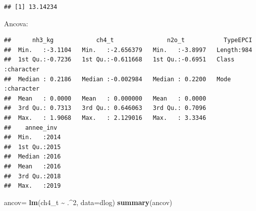 \documentclass[
]{article}
\newenvironment{Shaded}{\begin{snugshade}}{\end{snugshade}}
\newcommand{\AttributeTok}[1]{\textcolor[rgb]{0.13,0.29,0.53}{#1}}
\newcommand{\DecValTok}[1]{\textcolor[rgb]{0.00,0.00,0.81}{#1}}
\newcommand{\FunctionTok}[1]{\textcolor[rgb]{0.13,0.29,0.53}{\textbf{#1}}}
\newcommand{\NormalTok}[1]{#1}
\newcommand{\OtherTok}[1]{\textcolor[rgb]{0.56,0.35,0.01}{#1}}
\newcommand{\SpecialCharTok}[1]{\textcolor[rgb]{0.81,0.36,0.00}{\textbf{#1}}}
\begin{document}
\begin{verbatim}
## [1] 13.14234
\end{verbatim}

Ancova:

\begin{Shaded}
\end{Shaded}

\begin{verbatim}
##      nh3_kg            ch4_t               n2o_t           TypeEPCI        
##  Min.   :-3.1104   Min.   :-2.656379   Min.   :-3.8997   Length:984        
##  1st Qu.:-0.7236   1st Qu.:-0.611668   1st Qu.:-0.6951   Class :character  
##  Median : 0.2186   Median :-0.002984   Median : 0.2200   Mode  :character  
##  Mean   : 0.0000   Mean   : 0.000000   Mean   : 0.0000                     
##  3rd Qu.: 0.7313   3rd Qu.: 0.646063   3rd Qu.: 0.7096                     
##  Max.   : 1.9068   Max.   : 2.129016   Max.   : 3.3346                     
##    annee_inv   
##  Min.   :2014  
##  1st Qu.:2015  
##  Median :2016  
##  Mean   :2016  
##  3rd Qu.:2018  
##  Max.   :2019
\end{verbatim}

\begin{Shaded}
\begin{Highlighting}[]
\NormalTok{ancov}\OtherTok{=} \FunctionTok{lm}\NormalTok{(ch4\_t }\SpecialCharTok{\textasciitilde{}}\NormalTok{ .}\SpecialCharTok{\^{}}\DecValTok{2}\NormalTok{, }\AttributeTok{data=}\NormalTok{dlog)}
\FunctionTok{summary}\NormalTok{(ancov)}
\end{Highlighting}
\end{Shaded}
\end{document}
